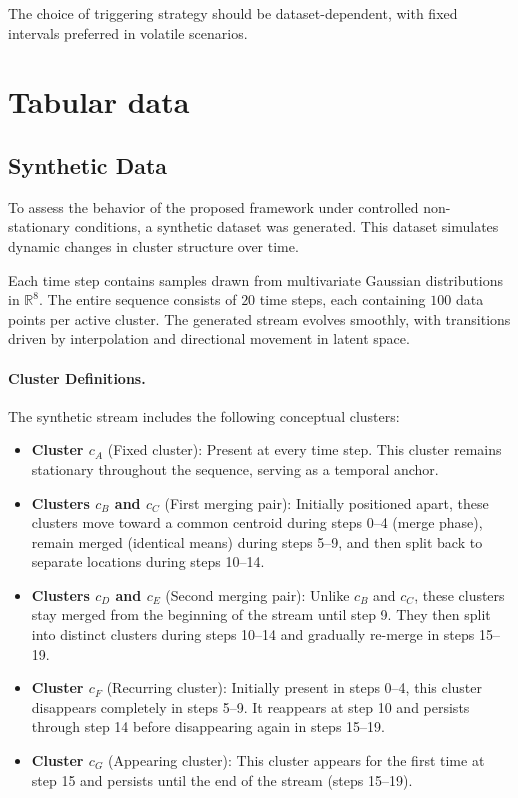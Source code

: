 \noindent The choice of triggering strategy should be dataset-dependent,
with fixed intervals preferred in volatile scenarios.

\section{Tabular data}\label{sec:tabular_data}

\subsection{Synthetic Data}\label{subsec:sythetic_data}

To assess the behavior of the proposed framework under controlled
non-stationary conditions, a synthetic dataset was generated. This dataset
simulates dynamic changes in cluster structure over time.

Each time step contains samples drawn from multivariate Gaussian distributions
in $\mathbb{R}^8$. The entire sequence consists of $20$ time steps, each
containing $100$ data points per active cluster. The generated stream evolves
smoothly, with transitions driven by interpolation and directional movement in
latent space.

\paragraph{Cluster Definitions.} The synthetic stream includes the following conceptual clusters:

\begin{itemize}
    \item \textbf{Cluster $ c_A $} (Fixed cluster): Present at every time step.
          This cluster remains stationary throughout the sequence, serving as a
          temporal anchor.

    \item \textbf{Clusters $ c_B $ and $ c_C $} (First merging pair): Initially
          positioned apart, these clusters move toward a common centroid during steps 0--4
          (merge phase), remain merged (identical means) during steps 5--9, and then split
          back to separate locations during steps 10--14.

    \item \textbf{Clusters $ c_D $ and $ c_E $} (Second merging pair): Unlike $ c_B $
          and $ c_C $, these clusters stay merged from the beginning of the stream until
          step 9. They then split into distinct clusters during steps 10--14 and gradually
          re-merge in steps 15--19.

    \item \textbf{Cluster $ c_F $} (Recurring cluster): Initially present in steps 0--4,
          this cluster disappears completely in steps 5--9. It reappears at step 10 and
          persists through step 14 before disappearing again in steps 15--19.

    \item \textbf{Cluster $ c_G $} (Appearing cluster): This cluster appears for
          the first time at step 15 and persists until the end of the stream (steps 15--19).
\end{itemize}


